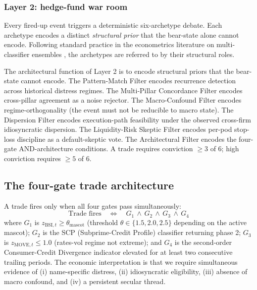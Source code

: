 \documentclass[11pt,a4paper]{article}
\begin{document}
\subsubsection{Layer 2: hedge-fund war room}

Every fired-up event triggers a deterministic six-archetype debate. Each archetype encodes a distinct \emph{structural prior} that the bear-state alone cannot encode. Following standard practice in the econometrics literature on multi-classifier ensembles \citep{ho1995random}, the archetypes are referred to by their structural roles.

The architectural function of Layer 2 is to encode structural priors that the bear-state cannot encode. The Pattern-Match Filter encodes recurrence detection across historical distress regimes. The Multi-Pillar Concordance Filter encodes cross-pillar agreement as a noise rejector. The Macro-Confound Filter encodes regime-orthogonality (the event must not be reducible to macro state). The Dispersion Filter encodes execution-path feasibility under the observed cross-firm idiosyncratic dispersion. The Liquidity-Risk Skeptic Filter encodes per-pod stop-loss discipline as a default-skeptic vote. The Architectural Filter encodes the four-gate AND-architecture conditions. A trade requires conviction $\ge 3$ of $6$; high conviction requires $\ge 5$ of $6$.

\subsection{The four-gate trade architecture}\label{sec:gates}

A trade fires only when all four gates pass simultaneously:
\begin{equation}
\text{Trade fires} \quad \Longleftrightarrow \quad G_1 \,\wedge\, G_2 \,\wedge\, G_3 \,\wedge\, G_4
\end{equation}
where $G_1$ is $z_{\text{BSI},t} \ge \theta_{\text{mascot}}$ (threshold $\theta \in \{1.5, 2.0, 2.5\}$ depending on the active mascot); $G_2$ is the SCP (Subprime-Credit Profile) classifier returning phase 2; $G_3$ is $z_{\text{MOVE},t} \le 1.0$ (rates-vol regime not extreme); and $G_4$ is the second-order Consumer-Credit Divergence indicator elevated for at least two consecutive trailing periods. The economic interpretation is that we require simultaneous evidence of (i) name-specific distress, (ii) idiosyncratic eligibility, (iii) absence of macro confound, and (iv) a persistent secular thread.
\end{document}

